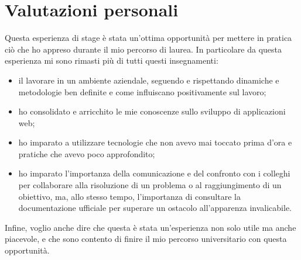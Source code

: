 \section{Valutazioni personali}
Questa esperienza di stage è stata un'ottima opportunità per mettere in pratica ciò che ho appreso durante il mio percorso di laurea.
In particolare da questa esperienza mi sono rimasti più di tutti questi insegnamenti:
\begin{itemize}
  \item il lavorare in un ambiente aziendale, seguendo  e rispettando dinamiche e metodologie ben definite e come influiscano positivamente sul lavoro;
  \item ho consolidato e arricchito le mie conoscenze sullo sviluppo di applicazioni web;
  \item ho imparato a utilizzare tecnologie che non avevo mai toccato prima d'ora e pratiche che avevo poco approfondito;
  \item ho imparato l'importanza della comunicazione e del confronto con i colleghi per collaborare alla risoluzione di un problema o al raggiungimento di un obiettivo, ma, allo stesso tempo, l'importanza di consultare la documentazione ufficiale per superare un ostacolo all'apparenza invalicabile.
\end{itemize}

\noindent Infine, voglio anche dire che questa è stata un'esperienza non solo utile ma anche piacevole, e che sono contento di finire il mio percorso universitario con questa opportunità.